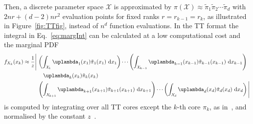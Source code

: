 Then, a discrete parameter space $\mathcal{X}$ is approximated by $\pi(\mathcal{X})\approx \tilde{\pi}_1  \tilde{\pi}_2  \cdots \tilde{\pi}_d$ with $2nr + (d-2)nr^2$ evaluation points for fixed ranks $r =r_{k-1} = r_k $, as illustrated in Figure~\ref{fig:TTfig}, instead of $n^d$ function evaluations.
In the TT format the integral in Eq.~\ref{eq:margInt} can be calculated at a low computational cost and the marginal PDF
\begin{align}
	\begin{split}
		f_{X_k}(x_k) \approx \frac{1}{z} \Bigg|\, 
		&\left( \int_{\mathcal{X}_1} \uplambda_1(x_1) \tilde{\pi}_1(x_1) \, \diff x_1 \right) \cdots 
		\left( \int_{\mathcal{X}_{k-1}} \uplambda_{k-1}(x_{k-1}) \tilde{\pi}_{k-1}(x_{k-1}) \, \diff x_{k-1} \right) \\
		&\quad \uplambda_k(x_k) \tilde{\pi}_k(x_k) \\
		& \left( \int_{\mathcal{X}_{k+1}} \uplambda_{k+1}(x_{k+1}) \tilde{\pi}_{k+1}(x_{k+1}) \,\diff x_{k+1} \right) \cdots 
		\left( \int_{\mathcal{X}_{d}} \uplambda_d(x_d) \tilde{\pi}_d(x_d) \, \diff x_d \right)
		\Bigg| 
	\end{split}
\end{align}
is computed by integrating over all TT cores except the $k$-th core $\pi_k$, as in~\cite{dolgov2020approximation}, and normalised by the constant $z$~\cite{cui2022deep}.


